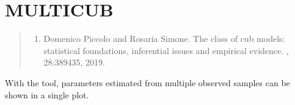 \documentclass[letterpaper,10pt,english]{sphinxmanual}
\begin{document}
\section{MULTICUB}
\label{\detokenize{manual:multicub}}\label{\detokenize{manual:multicub-manual}}\begin{quote}
\begin{enumerate}
%
\setcounter{enumi}{0}
\item {} 
\sphinxAtStartPar
Domenico Piccolo and Rosaria Simone. The class of cub models: statistical foundations, inferential issues and empirical evidence. , 28:389\textendash{}435, 2019.

\end{enumerate}
\end{quote}

\sphinxAtStartPar
{}

\sphinxAtStartPar
With the  tool, parameters estimated from
multiple observed samples can be shown in a single plot.
\end{document}
